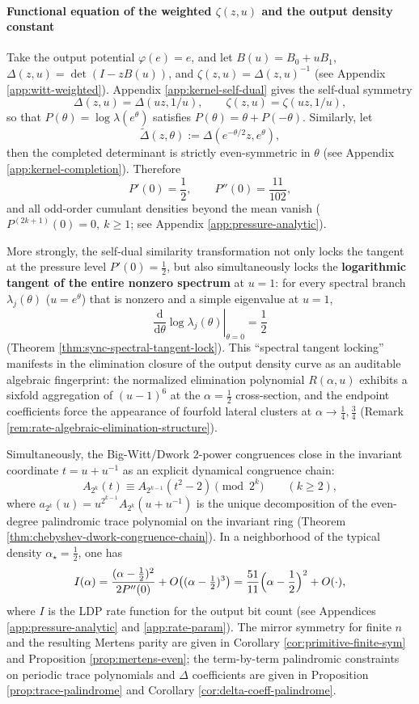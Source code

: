 \paragraph{Functional equation of the weighted $\zeta(z,u)$ and the output density constant}
Take the output potential $\varphi(e)=e$, and let $B(u)=B_0+uB_1$, $\Delta(z,u)=\det(I-zB(u))$, and $\zeta(z,u)=\Delta(z,u)^{-1}$ (see Appendix \ref{app:witt-weighted}). Appendix \ref{app:kernel-self-dual} gives the self-dual symmetry
\[
\Delta(z,u)=\Delta(uz,1/u),\qquad
\zeta(z,u)=\zeta(uz,1/u),
\]
so that $P(\theta)=\log\lambda(e^\theta)$ satisfies $P(\theta)=\theta+P(-\theta)$. Similarly, let
\[
\widetilde{\Delta}(z,\theta):=\Delta(e^{-\theta/2}z,e^\theta),
\]
then the completed determinant is strictly even-symmetric in $\theta$ (see Appendix \ref{app:kernel-completion}). Therefore
\[
P'(0)=\frac12,\qquad P''(0)=\frac{11}{102},
\]
and all odd-order cumulant densities beyond the mean vanish ($P^{(2k+1)}(0)=0,\ k\ge 1$; see Appendix \ref{app:pressure-analytic}).
\par
More strongly, the self-dual similarity transformation not only locks the tangent at the pressure level \(P'(0)=\tfrac12\), but also simultaneously locks the \textbf{logarithmic tangent of the entire nonzero spectrum} at \(u=1\): for every spectral branch \(\lambda_j(\theta)\) (\(u=e^\theta\)) that is nonzero and a simple eigenvalue at \(u=1\),
\[
\left.\frac{\mathrm{d}}{\mathrm{d}\theta}\log\lambda_j(\theta)\right|_{\theta=0}=\frac12
\]
(Theorem \ref{thm:sync-spectral-tangent-lock}).
This ``spectral tangent locking'' manifests in the elimination closure of the output density curve as an auditable algebraic fingerprint: the normalized elimination polynomial \(R(\alpha,u)\) exhibits a sixfold aggregation of \((u-1)^6\) at the \(\alpha=\tfrac12\) cross-section, and the endpoint coefficients force the appearance of fourfold lateral clusters at \(\alpha\to\tfrac14,\tfrac34\) (Remark \ref{rem:rate-algebraic-elimination-structure}).
\par
Simultaneously, the Big-Witt/Dwork \(2\)-power congruences close in the invariant coordinate \(t=u+u^{-1}\) as an explicit dynamical congruence chain:
\[
A_{2^k}(t)\equiv A_{2^{k-1}}(t^2-2)\pmod{2^k}\qquad(k\ge 2),
\]
where \(a_{2^k}(u)=u^{2^{k-1}}A_{2^k}(u+u^{-1})\) is the unique decomposition of the even-degree palindromic trace polynomial on the invariant ring (Theorem \ref{thm:chebyshev-dwork-congruence-chain}).
In a neighborhood of the typical density $\alpha_\star=\frac12$, one has
\[
I(\alpha)=\frac{(\alpha-\frac12)^2}{2P''(0)}+O\!\left((\alpha-\tfrac12)^3\right)
=\frac{51}{11}\Bigl(\alpha-\frac12\Bigr)^2+O(\cdot),
\]
where $I$ is the LDP rate function for the output bit count (see Appendices \ref{app:pressure-analytic} and \ref{app:rate-param}). The mirror symmetry for finite $n$ and the resulting Mertens parity are given in Corollary \ref{cor:primitive-finite-sym} and Proposition \ref{prop:mertens-even}; the term-by-term palindromic constraints on periodic trace polynomials and $\Delta$ coefficients are given in Proposition \ref{prop:trace-palindrome} and Corollary \ref{cor:delta-coeff-palindrome}.

